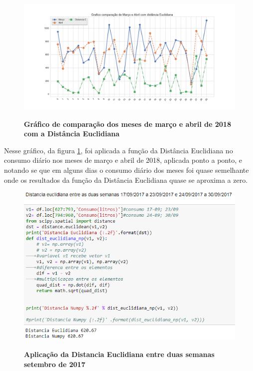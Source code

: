 \begin{figure}[ht]
	\caption{\textbf{Gráfico de comparação dos meses de março e abril de 2018 com a Distância Euclidiana}}
	\centering
		\includegraphics[width=\textwidth,height=\textheight , keepaspectratio]{figuras/ComparacaodeMarcoeAbrilcomdistanciaEuclidiana}
		\label{graf_dist_Marco_Abril}
\end{figure}
\par Nesse gráfico, da figura \ref{graf_dist_Marco_Abril}, foi aplicada a função da Distância Euclidiana no consumo diário nos meses de março e abril de 2018, aplicada ponto a ponto, e notando se que em alguns dias o consumo diário dos meses foi quase semelhante onde os resultados da função da Distância Euclidiana quase se aproxima a zero. 

\begin{figure}[ht]
	\caption{\textbf{Aplicação da Distancia Euclidiana entre duas semanas setembro de 2017}}
	\centering
		\includegraphics[width=\textwidth,height=\textheight , keepaspectratio]{figuras/distanciaeuclidiana17-09a23-09e24-09a30-09}
		\label{dist_duas_set}
\end{figure}

